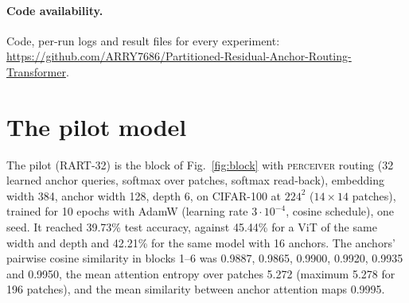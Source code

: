 \documentclass[runningheads]{llncs}
\begin{document}
\paragraph{Code availability.} Code, per-run logs and result files for every experiment:
\url{https://github.com/ARRY7686/Partitioned-Residual-Anchor-Routing-Transformer}.




\appendix

\section{The pilot model}
\label{app:pilot}
The pilot (RART-32) is the block of Fig.~\ref{fig:block} with \textsc{perceiver} routing (32
learned anchor queries, softmax over patches, softmax read-back), embedding width 384, anchor width
128, depth 6, on CIFAR-100 at $224^2$ ($14\times14$ patches), trained for 10 epochs with AdamW
(learning rate $3\cdot10^{-4}$, cosine schedule), one seed. It reached 39.73\% test accuracy,
against 45.44\% for a ViT of the same width and depth and 42.21\% for the same model with 16
anchors. The anchors' pairwise cosine similarity in blocks 1--6 was 0.9887, 0.9865, 0.9900,
0.9920, 0.9935 and 0.9950, the mean attention entropy over patches 5.272 (maximum 5.278 for 196
patches), and the mean similarity between anchor attention maps 0.9995.
\end{document}
